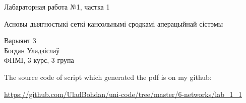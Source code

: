 {\Large
Лабараторная работа №1, частка 1\par
\vspace{5mm}
Асновы дыягностыкі сеткі кансольнымі сродкамі аперацыйнай сістэмы\par
\vspace{5mm}
Варыянт 3\\
Богдан Уладзіслаў\\
ФПМІ, 3 курс, 3 група\par
\vspace{5mm}
The source code of script which generated the pdf is on my github:\par
\url{https://github.com/UladBohdan/uni-code/tree/master/6-networks/lab_1_1}
}
